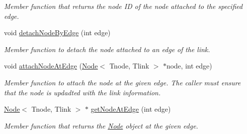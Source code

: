 \begin{DoxyCompactItemize}
\begin{DoxyCompactList}\small\item\em Member function that returns the node ID of the node attached to the specified edge. \end{DoxyCompactList}\item 
void \hyperlink{classLink_a847f85e9cf72ffa8f20acc3fad2f9eca}{detach\+Node\+By\+Edge} (int edge)
\begin{DoxyCompactList}\small\item\em Member function to detach the node attached to an edge of the link. \end{DoxyCompactList}\item 
void \hyperlink{classLink_af85376762a02a2ca25ca2cd99e9dc0f5}{attach\+Node\+At\+Edge} (\hyperlink{classNode}{Node}$<$ Tnode, Tlink $>$ $\ast$node, int edge)
\begin{DoxyCompactList}\small\item\em Member function to attach the node at the given edge. The caller must ensure that the node is updadted with the link information. \end{DoxyCompactList}\item 
\hyperlink{classNode}{Node}$<$ Tnode, Tlink $>$ $\ast$ \hyperlink{classLink_afd371e7c41ade7612eeb41cd5ec96921}{get\+Node\+At\+Edge} (int edge)
\begin{DoxyCompactList}\small\item\em Member function that returns the \hyperlink{classNode}{Node} object at the given edge. \end{DoxyCompactList}\end{DoxyCompactItemize}
